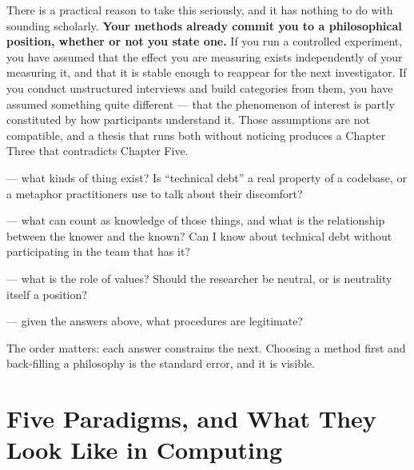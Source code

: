 There is a practical reason to take this seriously, and it has nothing to do
with sounding scholarly. \textbf{Your methods already commit you to a
philosophical position, whether or not you state one.} If you run a controlled
experiment, you have assumed that the effect you are measuring exists
independently of your measuring it, and that it is stable enough to reappear
for the next investigator. If you conduct unstructured interviews and build
categories from them, you have assumed something quite different --- that the
phenomenon of interest is partly constituted by how participants understand it.
Those assumptions are not compatible, and a thesis that runs both without
noticing produces a Chapter Three that contradicts Chapter Five.

\begin{definitionbox}
\begin{tight}
  \item {} --- what kinds of thing exist? Is ``technical debt'' a
    real property of a codebase, or a metaphor practitioners use to talk about
    their discomfort?
  \item {} --- what can count as knowledge of those things,
    and what is the relationship between the knower and the known? Can I know
    about technical debt without participating in the team that has it?
  \item {} --- what is the role of values? Should the researcher
    be neutral, or is neutrality itself a position?
  \item {} --- given the answers above, what procedures are
    legitimate?
\end{tight}
\medskip
The order matters: each answer constrains the next. Choosing a method first and
back-filling a philosophy is the standard error, and it is visible.
\end{definitionbox}

\section{Five Paradigms, and What They Look Like in Computing}

